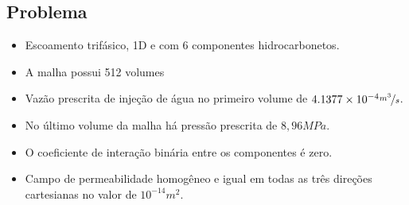 \documentclass[professionalfont]{beamer}
\begin{document}
\subsection{Problema \theproblem}

\begin{frame}{\FrameProblemName}

    \begin{itemize}
        \item Escoamento trifásico, 1D e com 6 componentes hidrocarbonetos. 
        \item A malha possui 512 volumes 
        \item Vazão prescrita de injeção de água no primeiro volume de $4.1377 \times 10^{-4} \nicefrac{m^{3}}{s}$. 
        \item No último volume da malha há pressão prescrita de $8, 96MPa$. 
        \item O coeficiente de interação binária entre os componentes é zero.
        \item  Campo de permeabilidade homogêneo e igual em todas as três direções cartesianas no valor de $10^{-14} m^{2}$.
    \end{itemize}
    
\end{frame}
\end{document}
